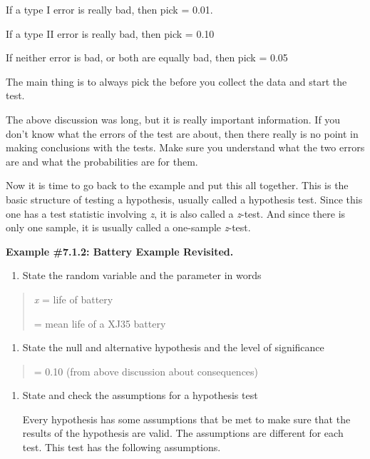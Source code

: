 \documentclass[]{book}
\providecommand{\tightlist}{%
  \setlength{\itemsep}{0pt}\setlength{\parskip}{0pt}}
\begin{document}
If a type I error is really bad, then pick = 0.01.

If a type II error is really bad, then pick = 0.10

If neither error is bad, or both are equally bad, then pick = 0.05

The main thing is to always pick the before you collect the data and start the test.

The above discussion was long, but it is really important information. If you don't know what the errors of the test are about, then there really is no point in making conclusions with the tests. Make sure you understand what the two errors are and what the probabilities are for them.

Now it is time to go back to the example and put this all together. This is the basic structure of testing a hypothesis, usually called a hypothesis test. Since this one has a test statistic involving \emph{z}, it is also called a \emph{z}-test. And since there is only one sample, it is usually called a one-sample \emph{z}-test.

\textbf{Example \#7.1.2: Battery Example Revisited. }

\begin{enumerate}
\def\labelenumi{\arabic{enumi}.}
\tightlist
\item
  State the random variable and the parameter in words
\end{enumerate}

\begin{quote}
\emph{x} = life of battery

= mean life of a XJ35 battery
\end{quote}

\begin{enumerate}
\def\labelenumi{\arabic{enumi}.}
\setcounter{enumi}{1}
\tightlist
\item
  State the null and alternative hypothesis and the level of
  significance
\end{enumerate}

\begin{quote}
= 0.10 (from above discussion about consequences)
\end{quote}

\begin{enumerate}
\def\labelenumi{\arabic{enumi}.}
\setcounter{enumi}{2}
\item
  State and check the assumptions for a hypothesis test

  Every hypothesis has some assumptions that be met to make sure that
  the results of the hypothesis are valid. The assumptions are
  different for each test. This test has the following assumptions.
\end{enumerate}
\end{document}
